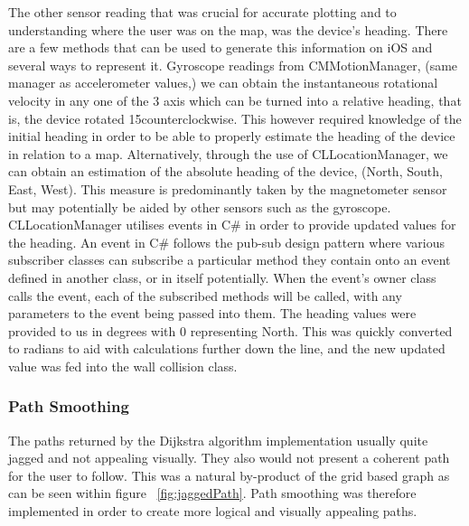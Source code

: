 \documentclass[12pt,a4paper]{report}
\begin{document}
The other sensor reading that was crucial for accurate plotting and to understanding where the user was on the map, was the device’s heading. There are a few methods that can be used to generate this information on iOS and several ways to represent it. Gyroscope readings from CMMotionManager, (same manager as accelerometer values,) we can obtain the instantaneous rotational velocity in any one of the 3 axis which can be turned into a relative heading, that is, the device rotated 15\textdegree counterclockwise. This however required knowledge of the initial heading in order to be able to properly estimate the heading of the device in relation to a map. Alternatively, through the use of CLLocationManager, we can obtain an estimation of the absolute heading of the device, (North, South, East, West). This measure is predominantly taken by the magnetometer sensor but may potentially be aided by other sensors such as the gyroscope. CLLocationManager utilises events in C\# in order to provide updated values for the heading. An event in C\# follows the pub-sub design pattern where various subscriber classes can subscribe a particular method they contain onto an event defined in another class, or in itself potentially. When the event’s owner class calls the event, each of the subscribed methods will be called, with any parameters to the event being passed into them. The heading values were provided to us in degrees with 0 representing North. This was quickly converted to radians to aid with calculations further down the line, and the new updated value was fed into the wall collision class.

\subsubsection{Path Smoothing}

The paths returned by the Dijkstra algorithm implementation usually quite jagged and not appealing visually. They also would not present a coherent path for the user to follow. This was a natural by-product of the grid based graph as can be seen within figure ~\ref{fig:jaggedPath}. Path smoothing was therefore implemented in order to create more logical and visually appealing paths.
\end{document}
